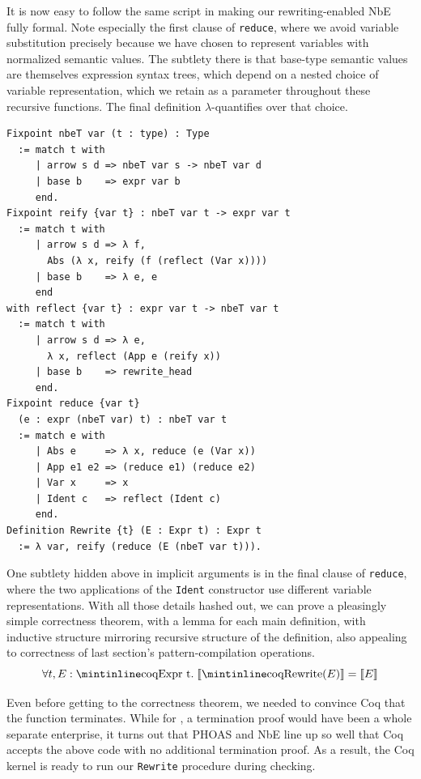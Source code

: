 It is now easy to follow the same script in making our rewriting-enabled NbE fully formal.
Note especially the first clause of \texttt{reduce}, where we avoid variable substitution precisely because we have chosen to represent variables with normalized semantic values.
The subtlety there is that base-type semantic values are themselves expression syntax trees, which depend on a nested choice of variable representation, which we retain as a parameter throughout these recursive functions.
The final definition $\lambda$-quantifies over that choice.
\begin{verbatim}
Fixpoint nbeT var (t : type) : Type
  := match t with
     | arrow s d => nbeT var s -> nbeT var d
     | base b    => expr var b
     end.
Fixpoint reify {var t} : nbeT var t -> expr var t
  := match t with
     | arrow s d => λ f,
       Abs (λ x, reify (f (reflect (Var x))))
     | base b    => λ e, e
     end
with reflect {var t} : expr var t -> nbeT var t
  := match t with
     | arrow s d => λ e,
       λ x, reflect (App e (reify x))
     | base b    => rewrite_head
     end.
Fixpoint reduce {var t}
  (e : expr (nbeT var) t) : nbeT var t
  := match e with
     | Abs e     => λ x, reduce (e (Var x))
     | App e1 e2 => (reduce e1) (reduce e2)
     | Var x     => x
     | Ident c   => reflect (Ident c)
     end.
Definition Rewrite {t} (E : Expr t) : Expr t
  := λ var, reify (reduce (E (nbeT var t))).
\end{verbatim}

One subtlety hidden above in implicit arguments is in the final clause of \texttt{reduce}, where the two applications of the \texttt{Ident} constructor use different variable representations.
With all those details hashed out, we can prove a pleasingly simple correctness theorem, with a lemma for each main definition, with inductive structure mirroring recursive structure of the definition, also appealing to correctness of last section's pattern-compilation operations.
$$\forall t, E : \textmintinline{coq}{Expr t}. \; \llbracket \textmintinline{coq}{Rewrite}(E) \rrbracket = \llbracket E \rrbracket$$

Even before getting to the correctness theorem, we needed to convince Coq that the function terminates.
While for \textcite{Aehlig}, a termination proof would have been a whole separate enterprise, it turns out that PHOAS and NbE line up so well that Coq accepts the above code with no additional termination proof.
As a result, the Coq kernel is ready to run our \texttt{Rewrite} procedure during checking.

